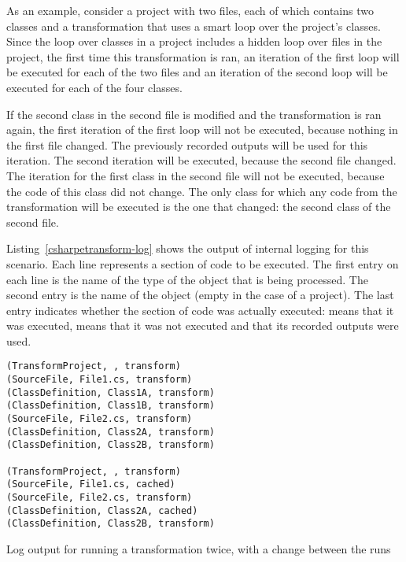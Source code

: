 \medskip

As an example, consider a project with two files, each of which contains two classes and a transformation that uses a smart  loop over the project's classes. Since the loop over classes in a project includes a hidden loop over files in the project, the first time this transformation is ran, an iteration of the first loop will be executed for each of the two files and an iteration of the second loop will be executed for each of the four classes.

If the second class in the second file is modified and the transformation is ran again, the first iteration of the first loop will not be executed, because nothing in the first file changed. The previously recorded outputs will be used for this iteration. The second iteration will be executed, because the second file changed. The iteration for the first class in the second file will not be executed, because the code of this class did not change. The only class for which any code from the transformation will be executed is the one that changed: the second class of the second file.

Listing~\ref{csharpetransform-log} shows the output of internal logging for this scenario. Each line represents a section of code to be executed. The first entry on each line is the name of the type of the object that is being processed. The second entry is the name of the object (empty in the case of a project). The last entry indicates whether the section of code was actually executed:  means that it was executed,  means that it was not executed and that its recorded outputs were used.

\begin{listing}
\begin{verbatim}
(TransformProject, , transform)
(SourceFile, File1.cs, transform)
(ClassDefinition, Class1A, transform)
(ClassDefinition, Class1B, transform)
(SourceFile, File2.cs, transform)
(ClassDefinition, Class2A, transform)
(ClassDefinition, Class2B, transform)

(TransformProject, , transform)
(SourceFile, File1.cs, cached)
(SourceFile, File2.cs, transform)
(ClassDefinition, Class2A, cached)
(ClassDefinition, Class2B, transform)
\end{verbatim}
\caption{Log output for running a transformation twice, with a change between the runs}
\label{csharpetransform-log}
\end{listing}

\bigskip

